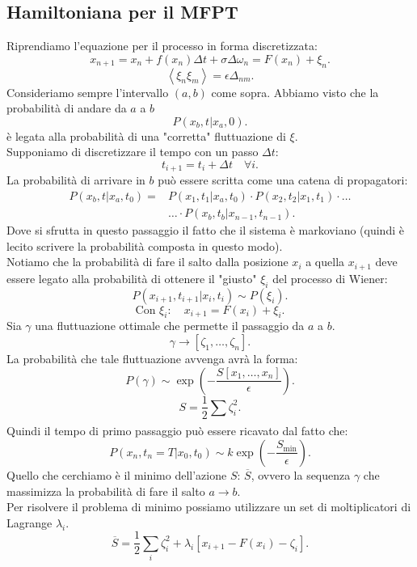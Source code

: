 \subsection{Hamiltoniana per il MFPT}%
\label{sub:Hamiltoniana per il MFPT}
Riprendiamo l'equazione per il processo in forma discretizzata:
\[
    x_{n+1} = x_n + f(x_n) \Delta t + \sigma \Delta\omega_n = F(x_n) + \xi_n
.\] 
\[
    \left<\xi_n\xi_m\right> = \epsilon\Delta_{nm}
.\] 
Consideriamo sempre l'intervallo $(a,b)$ come sopra. Abbiamo visto che la probabilità di andare da $a$ a $b$ 
\[
    P\left(x_b,t|x_a,0\right)
.\] 
è legata alla probabilità di una "corretta" fluttuazione di $\xi$. \\
Supponiamo di discretizzare il tempo con un passo $\Delta t$:
\[
    t_{i+1} = t_i + \Delta t 	\quad \forall i
.\] 
La probabilità di arrivare in $b$ può essere scritta come una catena di propagatori:
\[\begin{aligned}
    P\left(x_b,t|x_a,t_0\right)=&P\left(x_1,t_1|x_a,t_0\right)\cdot P\left(x_2,t_2|x_1,t_1\right)\cdot \ldots \\
				&\ldots \cdot P\left(x_b,t_b|x_{n-1},t_{n-1}\right)
.\end{aligned}\]
Dove si sfrutta in questo passaggio il fatto che il sistema è markoviano (quindi è lecito scrivere la probabilità composta in questo modo).\\
Notiamo che la probabilità di fare il salto dalla posizione $x_{i}$ a quella $x_{i+1}$ deve essere legato alla probabilità di ottenere il "giusto" $\xi_i$  del processo di Wiener:
\[
    P\left(x_{i+1}, t_{i+1}|x_i,t_i\right) \sim P(\xi_i) 
.\] 
\[
    \text{Con } \xi_i: \quad x_{i+1} = F(x_i) + \xi_i
.\] 
Sia $\gamma$ una fluttuazione ottimale che permette il passaggio da $a$ a $b$.
\[
	\gamma \to \left[\zeta_1, \ldots, \zeta_n\right]
.\] 
La probabilità che tale fluttuazione avvenga avrà la forma:
\[
    P(\gamma) \sim \exp\left(-\frac{S\left[x_1,\ldots,x_n\right]}{\epsilon}\right)
.\] 
\[
    S = \frac{1}{2}\sum_{}^{} \zeta^2_i
.\] 
Quindi il tempo di primo passaggio può essere ricavato dal fatto che:
\[
    P\left(x_n,t_n = T|x_0,t_0\right) \sim k \exp\left(-\frac{S_{\text{min}}}{\epsilon}\right)
.\] 
Quello che cerchiamo è il minimo dell'azione $S$: $\overline{S}$, ovvero la sequenza $\gamma$ che massimizza la probabilità di fare il salto $a\to b$.\\
Per risolvere il problema di minimo possiamo utilizzare un set di moltiplicatori di Lagrange $\lambda_i$.
\[
    \overline{S} = \frac{1}{2}\sum_{i}^{} \zeta^2_i + \lambda_i \left[x_{i+1}-F(x_i)- \zeta_i\right]
.\] 
